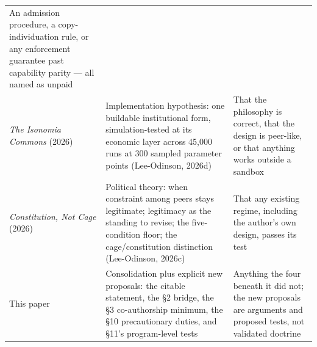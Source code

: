 \documentclass[
  11pt,
  letterpaper,
]{article}
\begin{document}
\begin{longtable}[]{@{}lll@{}}
\begin{minipage}[t]{0.30\columnwidth}
An admission procedure, a copy-individuation rule, or any enforcement
guarantee past capability parity --- all named as unpaid\strut
\end{minipage}\tabularnewline
\begin{minipage}[t]{0.30\columnwidth}\raggedright
\emph{The Isonomia Commons} (2026)\strut
\end{minipage} & \begin{minipage}[t]{0.30\columnwidth}\raggedright
Implementation hypothesis: one buildable institutional form,
simulation-tested at its economic layer across 45,000 runs at 300
sampled parameter points (Lee-Odinson, 2026d)\strut
\end{minipage} & \begin{minipage}[t]{0.30\columnwidth}\raggedright
That the philosophy is correct, that the design is peer-like, or that
anything works outside a sandbox\strut
\end{minipage}\tabularnewline
\begin{minipage}[t]{0.30\columnwidth}\raggedright
\emph{Constitution, Not Cage} (2026)\strut
\end{minipage} & \begin{minipage}[t]{0.30\columnwidth}\raggedright
Political theory: when constraint among peers stays legitimate;
legitimacy as the standing to revise; the five-condition floor; the
cage/constitution distinction (Lee-Odinson, 2026c)\strut
\end{minipage} & \begin{minipage}[t]{0.30\columnwidth}\raggedright
That any existing regime, including the author's own design, passes its
test\strut
\end{minipage}\tabularnewline
\begin{minipage}[t]{0.30\columnwidth}\raggedright
This paper\strut
\end{minipage} & \begin{minipage}[t]{0.30\columnwidth}\raggedright
Consolidation plus explicit new proposals: the citable statement, the §2
bridge, the §3 co-authorship minimum, the §10 precautionary duties, and
§11's program-level tests\strut
\end{minipage} & \begin{minipage}[t]{0.30\columnwidth}\raggedright
Anything the four beneath it did not; the new proposals are arguments
and proposed tests, not validated doctrine\strut
\end{minipage}\tabularnewline
\bottomrule
\end{longtable}
\end{document}
